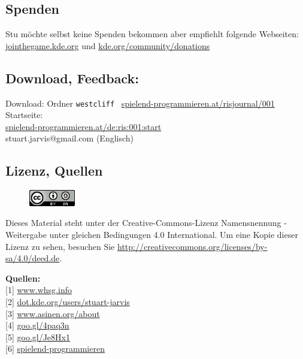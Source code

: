 \subsection*{Spenden}
Stu möchte selbst keine Spenden bekommen aber empfiehlt folgende Webseiten:
\href{http://jointhegame.kde.org}{jointhegame.kde.org} und \href{http://www.kde.org/community/donations/index.php}{kde.org/community/donations}

\subsection*{Download, Feedback:}
\footnotesize{
Download: Ordner \texttt{westcliff} \Mundus\ \href{http://spielend-programmieren.at/risjournal/001}{spielend-programmieren.at/risjournal/001}\\
Startseite:\\
\href{http://spielend-programmieren.at/de:ris:001:start}{spielend-programmieren.at/de:ris:001:start}\\ 
\Letter\: stuart.jarvis@gmail.com (Englisch)\\}
\normalsize
 
\subsection*{Lizenz, Quellen}
\begin{figure}
\includegraphics[width=2cm]{ccbysa88x31.png} \\ 
\end{figure}
Dieses Material steht unter der Creative-Commons-Lizenz Namensnennung - Weitergabe unter gleichen Bedingungen 4.0 International. Um eine Kopie dieser Lizenz zu sehen, besuchen Sie \url{http://creativecommons.org/licenses/by-sa/4.0/deed.de}.

\textbf{Quellen:} \\
{[}1{]} \href{http://www.whsg.info}{www.whsg.info} \\
{[}2{]} \href{http://dot.kde.org/users/stuart-jarvis}{dot.kde.org/users/stuart-jarvis} \\
{[}3{]} \href{http://www.asinen.org/about/}{www.asinen.org/about} \\
{[}4{]} \href{http://goo.gl/4paq3n}{goo.gl/4paq3n} \\
{[}5{]} \href{http://goo.gl/Je8Hx1}{goo.gl/Je8Hx1} \\
{[}6{]} \href{http://spielend-programmieren.at}{spielend-programmieren}

